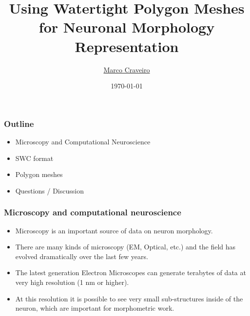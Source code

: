 \documentclass{beamer}
\title{Using Watertight Polygon Meshes for Neuronal Morphology Representation}
\author{
  \texorpdfstring
      {\href{mailto:marco.craveiro@gmail.com}{Marco Craveiro}}
      {Marco Craveiro}
}
\date{\today}
\begin{document}
\begin{frame}
\titlepage
\end{frame}

\begin{frame}
\frametitle{Outline}
\begin{itemize}
\item Microscopy and Computational Neuroscience
\pause
\item SWC format
\pause
\item Polygon meshes
\pause
\item Questions / Discussion
\end{itemize}
\end{frame}

\begin{frame}
\frametitle{Microscopy and computational neuroscience}

\begin{itemize}

\item Microscopy is an important source of data on neuron morphology.
\pause
\item There are many kinds of microscopy (EM, Optical, etc.) and the
  field has evolved dramatically over the last few years.
\pause
\item The latest generation Electron Microscopes can generate
  terabytes of data at very high resolution (1 nm or higher).
\pause
\item At this resolution it is possible to see very small
  sub-structures inside of the neuron, which are important for
  morphometric work.

\end{itemize}

\end{frame}
\end{document}
